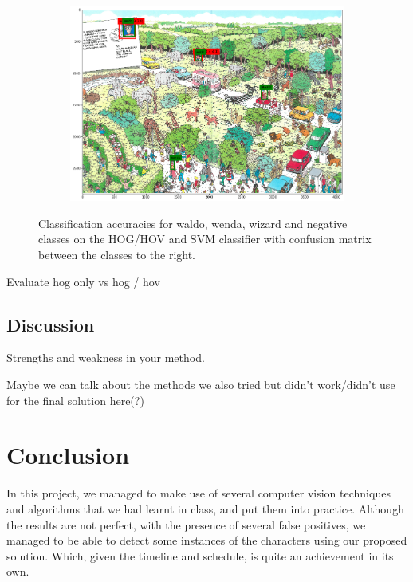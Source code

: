 \documentclass[11pt]{article}
\begin{document}
\begin{figure}[]
\begin{subfigure}{0.3\linewidth}
    \includegraphics[width =\linewidth]{figures/detections_2}
    \end{subfigure}

    \caption{Classification accuracies for waldo, wenda, wizard and negative classes on the HOG/HOV and SVM classifier
    with confusion matrix between the classes to the right.}
    \label{fig:detections}
\end{figure}

Evaluate hog only vs hog / hov
\subsection{Discussion}
Strengths and weakness in your method.

Maybe we can talk about the methods we also tried but didn't work/didn't use for the final solution here(?)

\section{Conclusion}
In this project, we managed to make use of several computer vision techniques and algorithms that we had learnt in class, and put them into practice. Although the results are not perfect, with the presence of several false positives, we managed to be able to detect some instances of the characters using our proposed solution. Which, given the timeline and schedule, is quite an achievement in its own.
\end{document}
